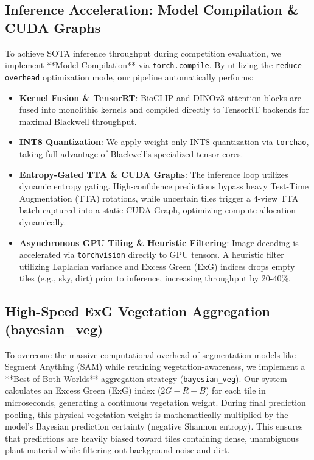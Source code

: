 \documentclass[10pt,twocolumn,letterpaper]{article}
\begin{document}
\subsection{Inference Acceleration: Model Compilation \& CUDA Graphs}
To achieve SOTA inference throughput during competition evaluation, we implement **Model Compilation** via \texttt{torch.compile}. By utilizing the \texttt{reduce-overhead} optimization mode, our pipeline automatically performs:
\begin{itemize}
    \item \textbf{Kernel Fusion \& TensorRT}: BioCLIP and DINOv3 attention blocks are fused into monolithic kernels and compiled directly to TensorRT backends for maximal Blackwell throughput.
    \item \textbf{INT8 Quantization}: We apply weight-only INT8 quantization via \texttt{torchao}, taking full advantage of Blackwell's specialized tensor cores.
    \item \textbf{Entropy-Gated TTA \& CUDA Graphs}: The inference loop utilizes dynamic entropy gating. High-confidence predictions bypass heavy Test-Time Augmentation (TTA) rotations, while uncertain tiles trigger a 4-view TTA batch captured into a static CUDA Graph, optimizing compute allocation dynamically.
    \item \textbf{Asynchronous GPU Tiling \& Heuristic Filtering}: Image decoding is accelerated via \texttt{torchvision} directly to GPU tensors. A heuristic filter utilizing Laplacian variance and Excess Green (ExG) indices drops empty tiles (e.g., sky, dirt) prior to inference, increasing throughput by 20-40\%.
\end{itemize}

\subsection{High-Speed ExG Vegetation Aggregation (bayesian\_veg)}
To overcome the massive computational overhead of segmentation models like Segment Anything (SAM) while retaining vegetation-awareness, we implement a **Best-of-Both-Worlds** aggregation strategy (\texttt{bayesian\_veg}). Our system calculates an Excess Green (ExG) index ($2G - R - B$) for each tile in microseconds, generating a continuous vegetation weight. During final prediction pooling, this physical vegetation weight is mathematically multiplied by the model's Bayesian prediction certainty (negative Shannon entropy). This ensures that predictions are heavily biased toward tiles containing dense, unambiguous plant material while filtering out background noise and dirt.
\end{document}
